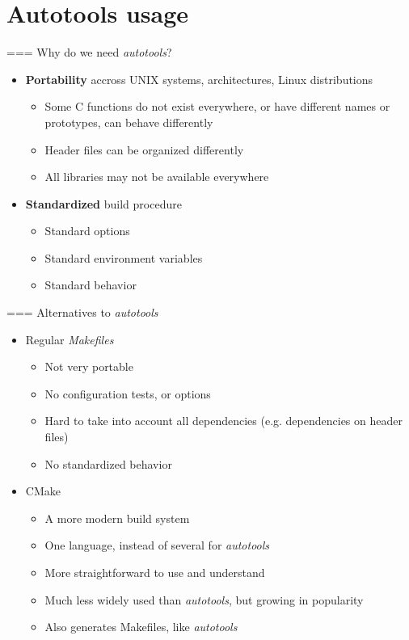 \section{Autotools usage}

=== {Why do we need {\em autotools}?}
  \begin{itemize}
  \item {\bf Portability} accross UNIX systems, architectures, Linux
    distributions
    \begin{itemize}
    \item Some C functions do not exist everywhere, or have different
      names or prototypes, can behave differently
    \item Header files can be organized differently
    \item All libraries may not be available everywhere
    \end{itemize}
  \item {\bf Standardized} build procedure
    \begin{itemize}
    \item Standard options
    \item Standard environment variables
    \item Standard behavior
    \end{itemize}
  \end{itemize}


=== {Alternatives to {\em autotools}}
  \begin{itemize}
  \item Regular {\em Makefiles}
    \begin{itemize}
    \item Not very portable
    \item No configuration tests, or options
    \item Hard to take into account all dependencies (e.g. dependencies
      on header files)
    \item No standardized behavior
    \end{itemize}
  \item CMake
    \begin{itemize}
    \item A more modern build system
    \item One language, instead of several for {\em autotools}
    \item More straightforward to use and understand
    \item Much less widely used than {\em autotools}, but growing in
      popularity
    \item Also generates Makefiles, like {\em autotools}
    \end{itemize}
  \end{itemize}


